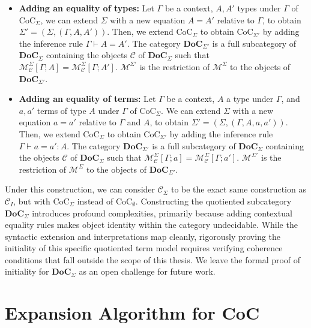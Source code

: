 \begin{itemize}
    \item \textbf{Adding an equality of types:}
          Let $\Gamma$ be a context, $A, A'$ types under $\Gamma$ of $\text{CoC}_\Sigma$, we can extend $\Sigma$ with
          a new equation $A = A'$ relative to $\Gamma$, to obtain $\Sigma' = (\Sigma, (\Gamma, A, A'))$. 
          Then, we extend $\text{CoC}_\Sigma$ to obtain $\text{CoC}_{\Sigma'}$ by adding the inference rule 
          $\Gamma \vdash A = A'$.
          The category $\mathbf{DoC}_{\Sigma'}$ is a full subcategory of $\mathbf{DoC}_\Sigma$ containing the objects 
          $\mathcal{C}$ of $\mathbf{DoC}_\Sigma$ such that $\mathcal{M}^\Sigma_\mathcal{C}[\Gamma; A] = \mathcal{M}^\Sigma_\mathcal{C}[\Gamma; A']$.
          $\mathcal{M}^{\Sigma'}$ is the restriction of $\mathcal{M}^\Sigma$ to the objects of $\mathbf{DoC}_{\Sigma'}$.
    \item \textbf{Adding an equality of terms:}
          Let $\Gamma$ be a context, $A$ a type under $\Gamma$, and $a, a'$ terms of type $A$ under $\Gamma$ 
          of $\text{CoC}_\Sigma$. We can extend $\Sigma$ with a new equation $a = a'$ relative to $\Gamma$ and $A$,
          to obtain $\Sigma' = (\Sigma, (\Gamma, A, a, a'))$.
          Then, we extend $\text{CoC}_\Sigma$ to obtain $\text{CoC}_{\Sigma'}$ by adding the inference rule 
          $\Gamma \vdash a = a' \colon A$.
          The category $\mathbf{DoC}_{\Sigma'}$ is a full subcategory of $\mathbf{DoC}_\Sigma$ containing the objects 
          $\mathcal{C}$ of $\mathbf{DoC}_\Sigma$ such that $\mathcal{M}^\Sigma_\mathcal{C}[\Gamma; a] = \mathcal{M}^\Sigma_\mathcal{C}[\Gamma; a']$.
          $\mathcal{M}^{\Sigma'}$ is the restriction of $\mathcal{M}^\Sigma$ to the objects of $\mathbf{DoC}_{\Sigma'}$.
\end{itemize}
Under this construction, we can consider $\mathcal{C}_\Sigma$ to be the exact same construction as $\mathcal{C}_I$,
but with $\text{CoC}_\Sigma$ instead of $\text{CoC}_\emptyset$. 
Constructing the quotiented subcategory $\mathbf{DoC}_{\Sigma}$ introduces profound complexities, primarily because adding contextual 
equality rules makes object identity within the category undecidable. While the syntactic extension and interpretations map cleanly,
rigorously proving the initiality of this specific quotiented term model requires verifying coherence conditions that fall outside the 
scope of this thesis. We leave the formal proof of initiality for $\mathbf{DoC}_{\Sigma}$ as an open challenge for future work.


\section{Expansion Algorithm for CoC}

